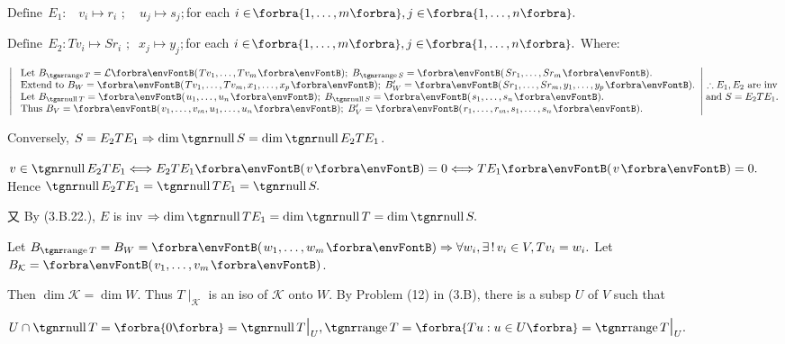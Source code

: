 \documentclass[a4paper, 11pt, UTF8]{article}
\begin{document}
\begin{large}
\par\quad
$\text{Define}\;\,E_1:\,\,\,\,\, v_i\mapsto r_i\,\,;\quad u_j\mapsto s_j;$\quad for each $i\in\!\Bra{1,\dots,m},j\in\!\Bra{1,\dots,n}.$\par\quad
$\text{Define}\;\,E_2:Tv_i\mapsto Sr_i\,\,;\;\;x_j\mapsto y_j;$\quad for each $i\in\!\Bra{1,\dots,m},j\in\!\Bra{1,\dots,n}.$
Where:\par\vspace{6pt}\quad
$\MathLeftrightMid{l}{$
	Let $B_{\range T}=\Lm{Tv_1,\dots,Tv_m};\;B_{\range S}=\Par{Sr_1,\dots,Sr_m}.\\ $
	Extend to $B_W=\Par{Tv_1,\dots,Tv_m,x_1,\dots,x_p};\;B_W'=\Par{Sr_1,\dots,Sr_m,y_1,\dots,y_p}.\\ $
	Let $B_{\null T}=\Par{u_1,\dots,u_n};\;B_{\null S}=\Par{s_1,\dots,s_n}.\\ $
	Thus $B_V=\Par{v_1,\dots,v_m,u_1,\dots,u_n};\;B_V'=\Par{r_1,\dots,r_m,s_1,\dots,s_n}.}\hMath{c}{}{}{\therefore E_1,E_2$ are inv$ \\ $and $S=E_2 TE_1.}$\par\vspace{6pt}\quad
Conversely, \;$S=E_2 TE_1\Rightarrow\dim\null S=\dim\null E_2 TE_1$.\par\quad
$v\in\null E_2 TE_1\Longleftrightarrow E_2 TE_1\Par{v}=0\Longleftrightarrow TE_1\Par{v}=0.$ Hence $\null E_2 TE_1=\null TE_1=\null S.$\par\quad
又 By (3.B.22.\COROLLARY), $E$ is inv $\Rightarrow\dim\null TE_1=\dim\null T=\dim\null S.$\PfEnd
\SepLine

\par\quad
Let $B_{\range T}=B_W=\Par{w_1,\dots,w_m}\Rightarrow\forall w_i,\exists\,!\,v_i\in V,Tv_i=w_i.$ Let $B_{\mathcal{K}}=\Par{v_1,\dots,v_m}$.\par\quad
Then $\dim\mathcal{K}=\dim W.$ Thus $T\mid_{\mathcal{K}}$ is an iso of ${\mathcal{K}}$ onto $W.$\PfEnd\vspace{6pt}\quad
\Or By Problem (12) in (3.B), there is a subsp $U$ of $V$ such that\par\quad
$U\cap \null T=\zeroSubs=\null T\mid_U,\range T=\Bra{Tu:u\in U}=\range T\mid_U.$\PfEnd
\SepLine
\pagebreak


\end{large}
\end{document}
